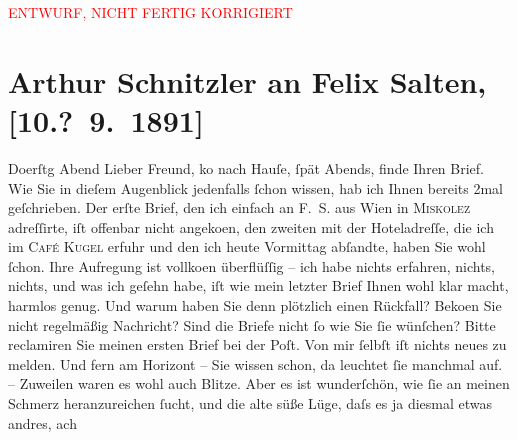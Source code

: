 
\begin{center}
            \textcolor{red}{ENTWURF, NICHT FERTIG KORRIGIERT}
                      \end{center}
            
         
         \renewcommand{\erwaehntePersonen}{Personen: Felix Salten}
         \renewcommand{\erwaehnteOrte}{Orte: Café Kugel, Miskolc, Wien}
         \renewcommand{\erwaehnteWerke}{}
               \section[Arthur Schnitzler an Felix Salten, {[}10.? 9. 1891{]}]{ Arthur Schnitzler an Felix Salten, {[}10.? 9. 1891{]}}\nopagebreak{}\rehead{ }\begin{ledgroupsized}[t]{13cm}\normalsize\beginnumbering \toendnotes[C]{\smallbreak\pagebreak[2]} 
\toendnotes[C]{\smallbreak}\pstart
           \raggedleft{}{\pb}Do{\geminationn}erſtg{ }Abend\pend
           \pstart
           Lieber Freund, ko{\geminationm} nach Hauſe, ſpät
               Abends, finde Ihren Brief. Wie Sie in dieſem Augenblick jedenfalls ſchon wissen, hab
               ich Ihnen bereits 2mal geſchrieben. Der erſte {\pb}Brief, den ich einfach an
               F. S. aus Wien in \textsc{Miskolez} adreſſirte, iſt offenbar nicht angeko{\geminationm}en, den
               zweiten mit der Hoteladreſſe, die ich im \textsc{Café Kugel} erfuhr und den ich heute Vormittag abſandte, haben Sie wohl ſchon. Ihre
               Aufregung ist vollko{\geminationm}en {\pb}überflüſſig – ich habe nichts
               erfahren, nichts, nichts, und was ich geſehn habe, iſt wie mein letzter Brief Ihnen
               wohl klar macht, harmlos genug. Und warum haben Sie denn plötzlich einen Rückfall?
               Beko{\geminationm}en­ Sie nicht regelmäßig Nachricht? {\pb}Sind die Briefe nicht ſo wie Sie
               ſie wünſchen? Bitte reclamiren Sie meinen ersten Brief bei der Poſt. Von mir ſelbſt
               iſt nichts neues zu melden. Und fern am Horizont – Sie wissen schon, da leuchtet {\pb}ſie manchmal auf. – Zuweilen waren
               es wohl auch Blitze. Aber es ist wunderſchön, wie ſie an meinen Schmerz
               heranzureichen ſucht, und die alte süße Lüge, daſs es ja diesmal etwas andres, ach

\end{ledgroupsized}
